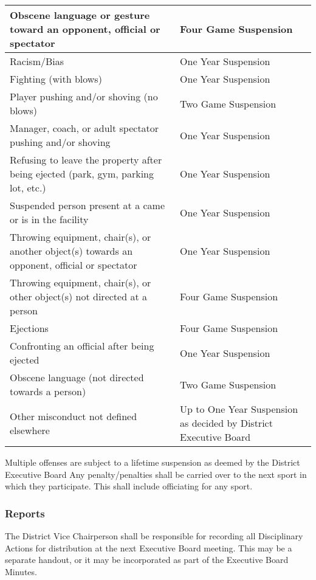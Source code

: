 \begin{center}
    \begin{tabular}{| m{7.25cm} | m{3.75cm} |}
        \hline
        Obscene language or gesture toward an opponent, official or spectator & Four Game Suspension \\
        \hline
        Racism/Bias	& One Year Suspension \\
        \hline  
        Fighting (with blows) &	One Year Suspension \\
        \hline
        Player pushing and/or shoving (no blows) & Two Game Suspension \\
        \hline
        Manager, coach, or adult spectator pushing and/or shoving & One Year Suspension \\
        \hline
        Refusing to leave the property after being ejected (park, gym, parking lot, etc.) & One Year Suspension \\
        \hline
        Suspended person present at a came or is in the facility & One Year Suspension \\
        \hline
        Throwing equipment, chair(s), or another object(s) towards an opponent, official or spectator & One Year Suspension \\
        \hline
        Throwing equipment, chair(s), or other object(s) not directed at a person & Four Game Suspension \\
        \hline
        Ejections & Four Game Suspension \\
        \hline
        Confronting an official after being ejected	& One Year Suspension \\ 
        \hline
        Obscene language (not directed towards a person) & Two Game Suspension \\
        \hline
        Other misconduct not defined elsewhere & Up to One Year Suspension as decided by District Executive Board \\
        \hline
    \end{tabular}
\end{center}

Multiple offenses are subject to a lifetime suspension as deemed by the District Executive Board		
Any penalty/penalties shall be carried over to the next sport in which they participate.  This shall include 
officiating for any sport.

\subsubsection{Reports}
The District Vice Chairperson shall be responsible for recording all Disciplinary Actions for distribution at the next Executive Board meeting.  This may be a separate handout, or it may be incorporated as part of the Executive Board Minutes.

